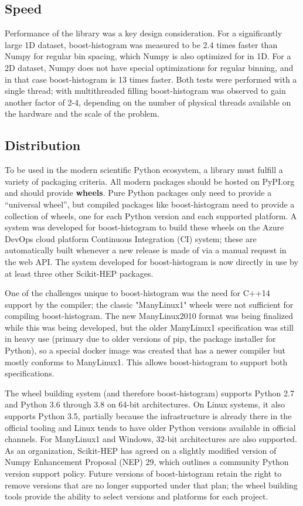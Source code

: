 \documentclass{webofc}
\begin{document}
\subsection{Speed}

Performance of the library was a key design consideration. For a significantly large 1D dataset, boost-histogram was measured to be 2.4 times faster than Numpy for regular bin spacing, which Numpy is also optimized for in 1D. For a 2D dataset, Numpy does not have special optimizations for regular binning, and in that case boost-histogram is 13 times faster. Both tests were performed with a single thread; with multithreaded filling boost-histogram was observed to gain another factor of 2-4, depending on the number of physical threads available on the hardware and the scale of the problem.

\subsection{Distribution}

To be used in the modern scientific Python ecosystem, a library must fulfill a variety of packaging criteria. All modern packages should be hosted on PyPI.org and should provide \textbf{wheels}. Pure Python packages only need to provide a ``universal wheel'', but compiled packages like boost-histogram need to provide a collection of wheels, one for each Python version and each supported platform. A system was developed for boost-histogram to build these wheels on the Azure DevOps cloud platform Continuous Integration (CI) system; these are automatically built whenever a new release is made of via a manual request in the web API. The system developed for boost-histogram is now directly in use by at least three other Scikit-HEP packages.

One of the challenges unique to boost-histogram was the need for C++14 support by the compiler; the classic "ManyLinux1" wheels were not sufficient for compiling boost-histogram. The new ManyLinux2010 format was being finalized while this was being developed, but the older ManyLinux1 specification was still in heavy use 
(primary due to older versions of pip, the package installer for Python), so a special docker image was created that has a newer compiler but mostly conforms to ManyLinux1. This allows boost-histogram to support both specifications.

The wheel building system (and therefore boost-histogram) supports Python 2.7 and Python 3.6 through 3.8 on 64-bit architectures. On Linux systems, it also supports Python 3.5, partially because the infrastructure is already there in the official tooling and Linux tends to have older Python versions available in official channels. For ManyLinux1 and Windows, 32-bit architectures are also supported. As an organization, Scikit-HEP has agreed on a slightly modified version of Numpy Enhancement Proposal (NEP) 29, which outlines a community Python version support policy. Future versions of boost-histogram retain the right to remove versions that are no longer supported under that plan; the wheel building tools provide the ability to select versions and platforms for each project.
\end{document}

